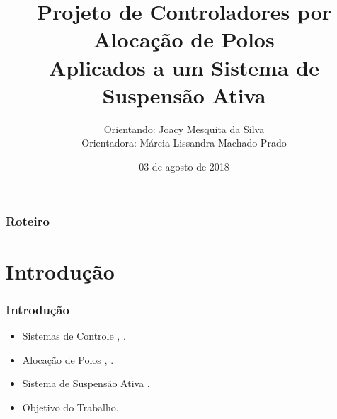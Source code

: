 \documentclass{beamer}
\title[]{Projeto de Controladores por Alocação de Polos\\Aplicados a um Sistema de Suspensão Ativa} %
\author[Joacy Mesquita, Márcia Prado]{Orientando: Joacy Mesquita da Silva\\Orientadora: Márcia Lissandra Machado Prado} %
\institute[UEFS] %
{
Trabalho de Conclusão de Curso\\Curso de Engenharia de Computação\\Universidade Estadual de Feira de Santana \\ %
\medskip
\textit{joacymsilva@gmail.com, marcia.lissandra@gmail.com} %
}
\date{03 de agosto de 2018} %
\begin{document}
\begin{frame}
\titlepage %
\end{frame}

\begin{frame}
\frametitle{Roteiro} %
\tableofcontents %
\end{frame}


\section{Introdução} %

\begin{frame}
\frametitle{Introdução}
\begin{itemize}
\item Sistemas de Controle \cite{ogata}, \cite{nise}.
\item Alocação de Polos \cite{ogata}, \cite{maitelli}.
\item Sistema de Suspensão Ativa \cite{quanser}.
\item Objetivo do Trabalho.
\end{itemize}
\end{frame}

\end{document}
